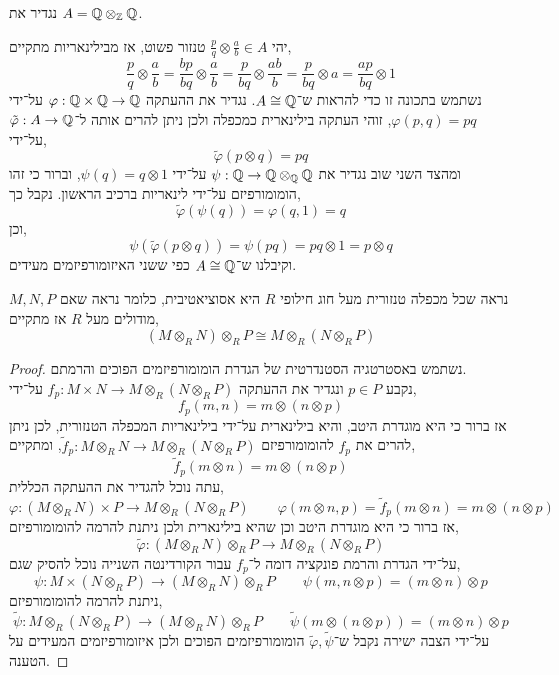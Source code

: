 \subquestion{}
נגדיר את $A = \mathbb{Q} \otimes_{\mathbb{Z}} \mathbb{Q}$.
\begin{solution}
	יהי $\frac{p}{q} \otimes \frac{a}{b} \in A$ טנזור פשוט, אז מבילינאריות מתקיים,
	\[
		\frac{p}{q} \otimes \frac{a}{b}
		= \frac{b p}{b q} \otimes \frac{a}{b}
		= \frac{p}{b q} \otimes \frac{a b}{b}
		= \frac{p}{b q} \otimes a
		= \frac{a p}{b q} \otimes 1
	\]
	נשתמש בתכונה זו כדי להראות ש־$A \cong \mathbb{Q}$.
	נגדיר את ההעתקה $\varphi : \mathbb{Q} \times \mathbb{Q} \to \mathbb{Q}$ על־ידי $\varphi(p, q) = p q$, זוהי העתקה בילינארית כמכפלה ולכן ניתן להרים אותה ל־$\tilde{\varphi} : A \to \mathbb{Q}$ על־ידי,
	\[
		\tilde{\varphi}(p \otimes q)
		= p q
	\]
	ומהצד השני שוב נגדיר את $\psi : \mathbb{Q} \to \mathbb{Q} \otimes_{\mathbb{Q}} \mathbb{Q}$ על־ידי $\psi(q) = q \otimes 1$, וברור כי זהו הומומורפיזם על־ידי לינאריות ברכיב הראשון.
	נקבל כך,
	\[
		\tilde{\varphi}(\psi(q))
		= \varphi(q, 1)
		= q
	\]
	וכן,
	\[
		\psi(\tilde{\varphi}(p \otimes q))
		= \psi(p q)
		= p q \otimes 1
		= p \otimes q
	\]
	וקיבלנו ש־$A \cong \mathbb{Q}$ כפי ששני האיזומורפיזמים מעידים.
\end{solution}

\question{}
נראה שכל מכפלה טנזורית מעל חוג חילופי $R$ היא אסוציאטיבית, כלומר נראה שאם $M, N, P$ מודולים מעל $R$ אז מתקיים,
\[
	(M \otimes_R N) \otimes_R P
	\cong M \otimes_R (N \otimes_R P)
\]
\begin{proof}
	נשתמש באסטרטגיה הסטנדרטית של הגדרת הומומורפיזמים הפוכים והרמתם. \\
	נקבע $p \in P$ ונגדיר את ההעתקה $f_p : M \times N \to M \otimes_R (N \otimes_R P)$ על־ידי,
	\[
		f_p(m, n)
		= m \otimes (n \otimes p)
	\]
	אז ברור כי היא מוגדרת היטב, והיא בילינארית על־ידי בילינאריות המכפלה הטנזורית, לכן ניתן להרים את $f_p$ להומומורפיזם $\tilde{f}_p : M \otimes_R N \to M \otimes_R (N \otimes_R P)$,
	ומתקיים,
	\[
		\tilde{f}_p(m \otimes n)
		= m \otimes (n \otimes p)
	\]
	עתה נוכל להגדיר את ההעתקה הכללית,
	\[
		\varphi : (M \otimes_R N) \times P \to M \otimes_R (N \otimes_R P)
		\qquad
		\varphi(m \otimes n, p)
		= \tilde{f}_p(m \otimes n)
		= m \otimes (n \otimes p)
	\]
	אז ברור כי היא מוגדרת היטב וכן שהיא בילינארית ולכן ניתנת להרמה להומומורפיזם,
	\[
		\tilde{\varphi} : (M \otimes_R N) \otimes_R P \to M \otimes_R (N \otimes_R P)
	\]
	על־ידי הגדרת והרמת פונקציה דומה ל־$f_p$ עבור הקורדינטה השנייה נוכל להסיק שגם,
	\[
		\psi : M \times (N \otimes_R P) \to (M \otimes_R N) \otimes_R P
		\qquad
		\psi(m, n \otimes p)
		= (m \otimes n) \otimes p
	\]
	ניתנת להרמה להומומורפיזם,
	\[
		\tilde{\psi} : M \otimes_R (N \otimes_R P) \to (M \otimes_R N) \otimes_R P
		\qquad
		\tilde{\psi}(m \otimes (n \otimes p))
		= (m \otimes n) \otimes p
	\]
	על־ידי הצבה ישירה נקבל ש־$\tilde{\varphi}, \tilde{\psi}$ הומומורפיזמים הפוכים ולכן איזומורפיזמים המעידים על הטענה.
\end{proof}

